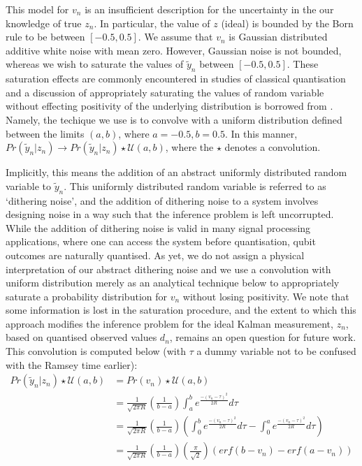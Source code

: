 This model for $v_n$ is an insufficient description for  the uncertainty in the our knowledge of true $z_n$. In particular, the value of $z$ (ideal) is bounded by the Born rule to be between $[-0.5, 0.5]$. We assume that $v_n$ is Gaussian distributed additive white noise with mean zero. However, Gaussian noise is not bounded, whereas we wish to saturate the values of $\tilde{y}_n$ between $[-0.5, 0.5]$. These saturation effects are commonly encountered in studies of classical quantisation and a discussion of appropriately saturating the values of random variable without effecting positivity of the underlying distribution is borrowed from \cite{widrow1996}. Namely, the techique we use is to convolve with a uniform distribution defined between the limits $(a,b)$, where $a=-0.5, b=0.5$. In this manner, $Pr( \tilde{y}_n | z_n) \to Pr( \tilde{y}_n | z_n) \star \mathcal{U}(a,b)$, where the $\star$ denotes a convolution. 

Implicitly, this means the addition of an abstract uniformly distributed random variable to $\tilde{y}_n$. This uniformly distributed random variable is referred to as `dithering noise', and the addition of dithering noise to a system involves designing noise in a way such that the inference problem is left uncorrupted. While the addition of dithering noise is valid in many signal processing applications, where one can access the system before quantisation, qubit outcomes are naturally quantised. As yet, we do not assign a physical interpretation of our abstract dithering noise and we use a convolution with uniform distribution merely as an analytical  technique below to appropriately saturate a probability distribution for $v_n$ without losing positivity. We note that some information is lost in the saturation procedure, and the extent to which this approach modifies the inference problem for the ideal Kalman measurement, $z_n$, based on quantised observed values $d_n$, remains an open question for future work.  This convolution is computed below (with $\tau$ a dummy variable not to be confused with the Ramsey time earlier):
\begin{align}
Pr( \tilde{y}_n | z_n) \star \mathcal{U}(a,b) & =  Pr( v_n) \star \mathcal{U}(a,b) \\
&= \frac{1}{\sqrt{2\pi R}} \left( \frac{1}{b-a} \right)\int_{a}^{b} e^{\frac{-(v_n - \tau)^2}{2R}} d\tau \\
&= \frac{1}{\sqrt{2\pi R}} \left( \frac{1}{b-a} \right) \left( \int_{0}^{b} e^{\frac{-(v_n - \tau)^2}{2R}} d\tau - \int_{0}^{a} e^{\frac{-(v_n - \tau)^2}{2R}} d\tau \right) \\
&= \frac{1}{\sqrt{2\pi R}} \left( \frac{1}{b-a} \right) \left( \frac{\pi}{\sqrt{2}} \right) \left( erf(b - v_n) - erf(a - v_n)\right) 
\end{align}


